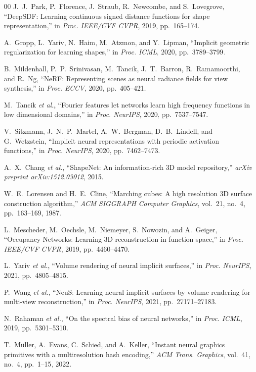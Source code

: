 \documentclass[conference]{IEEEtran}
\begin{document}
\begin{thebibliography}{00}
 J.~J.~Park, P.~Florence, J.~Straub, R.~Newcombe, and S.~Lovegrove, ``DeepSDF: Learning continuous signed distance functions for shape representation,'' in \textit{Proc. IEEE/CVF CVPR}, 2019, pp.~165--174.

 A.~Gropp, L.~Yariv, N.~Haim, M.~Atzmon, and Y.~Lipman, ``Implicit geometric regularization for learning shapes,'' in \textit{Proc. ICML}, 2020, pp.~3789--3799.

 B.~Mildenhall, P.~P.~Srinivasan, M.~Tancik, J.~T.~Barron, R.~Ramamoorthi, and R.~Ng, ``NeRF: Representing scenes as neural radiance fields for view synthesis,'' in \textit{Proc. ECCV}, 2020, pp.~405--421.

 M.~Tancik \textit{et al.}, ``Fourier features let networks learn high frequency functions in low dimensional domains,'' in \textit{Proc. NeurIPS}, 2020, pp.~7537--7547.

 V.~Sitzmann, J.~N.~P.~Martel, A.~W.~Bergman, D.~B.~Lindell, and G.~Wetzstein, ``Implicit neural representations with periodic activation functions,'' in \textit{Proc. NeurIPS}, 2020, pp.~7462--7473.

 A.~X.~Chang \textit{et al.}, ``ShapeNet: An information-rich 3D model repository,'' \textit{arXiv preprint arXiv:1512.03012}, 2015.

 W.~E.~Lorensen and H.~E.~Cline, ``Marching cubes: A high resolution 3D surface construction algorithm,'' \textit{ACM SIGGRAPH Computer Graphics}, vol.~21, no.~4, pp.~163--169, 1987.

 L.~Mescheder, M.~Oechsle, M.~Niemeyer, S.~Nowozin, and A.~Geiger, ``Occupancy Networks: Learning 3D reconstruction in function space,'' in \textit{Proc. IEEE/CVF CVPR}, 2019, pp.~4460--4470.

 L.~Yariv \textit{et al.}, ``Volume rendering of neural implicit surfaces,'' in \textit{Proc. NeurIPS}, 2021, pp.~4805--4815.

 P.~Wang \textit{et al.}, ``NeuS: Learning neural implicit surfaces by volume rendering for multi-view reconstruction,'' in \textit{Proc. NeurIPS}, 2021, pp.~27171--27183.

 N.~Rahaman \textit{et al.}, ``On the spectral bias of neural networks,'' in \textit{Proc. ICML}, 2019, pp.~5301--5310.

 T.~M\"{u}ller, A.~Evans, C.~Schied, and A.~Keller, ``Instant neural graphics primitives with a multiresolution hash encoding,'' \textit{ACM Trans. Graphics}, vol.~41, no.~4, pp.~1--15, 2022.

\end{thebibliography}
\end{document}
